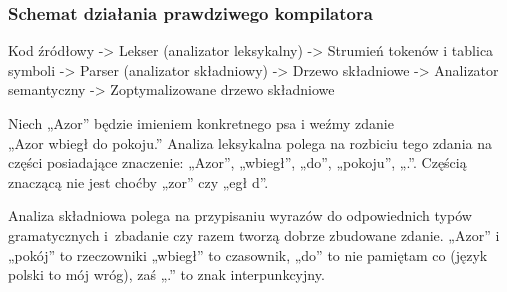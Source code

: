 \documentclass[10pt,t]{beamer}
\begin{document}




\begin{frame}
  \frametitle{Schemat działania prawdziwego kompilatora}







  Kod źródłowy -> Lekser (analizator leksykalny) -> Strumień tokenów i
  tablica symboli -> Parser (analizator składniowy) -> Drzewo
  składniowe -> Analizator semantyczny -> Zoptymalizowane drzewo składniowe

  Niech „Azor” będzie imieniem konkretnego psa i weźmy zdanie \\
  „Azor wbiegł do pokoju.”
  Analiza leksykalna polega na rozbiciu tego zdania na części
  posiadające znaczenie: „Azor”, „wbiegł”, „do”, „pokoju”, „.”. Częścią
  znaczącą nie jest choćby „zor” czy „egł d”.

  Analiza składniowa polega na przypisaniu wyrazów do odpowiednich typów
  gramatycznych i~zbadanie czy razem tworzą dobrze zbudowane zdanie.
  „Azor” i „pokój” to rzeczowniki „wbiegł” to czasownik, „do” to nie
  pamiętam co (język polski to mój wróg), zaś „.” to znak interpunkcyjny.

\end{frame}
\end{document}
